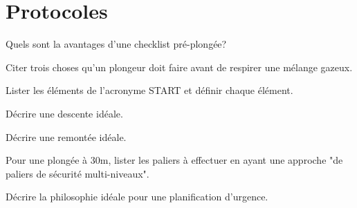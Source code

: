 \documentclass[english,12pt,a4paper]{article}
\begin{document}
	\section{Protocoles}
	\begin{outline}
		\1 Quels sont la avantages d'une checklist pré-plongée?
			\2[] \hspace{-2em}\hrulefill
			\2[] \hspace{-2em}\hrulefill
			\2[] \hspace{-2em}\hrulefill

		\1 Citer trois choses qu'un plongeur doit faire avant de respirer une mélange gazeux.
			\2[] \hspace{-2em}\hrulefill
			\2[] \hspace{-2em}\hrulefill
			\2[] \hspace{-2em}\hrulefill

		\1 Lister les éléments de l'acronyme START et définir chaque élément.
			\2[S] \hrulefill
			\2[T] \hrulefill
			\2[A] \hrulefill
			\2[R] \hrulefill
			\2[T] \hrulefill

		\1 Décrire une descente idéale.
			\2[] \hspace{-2em}\hrulefill
			\2[] \hspace{-2em}\hrulefill
			\2[] \hspace{-2em}\hrulefill

		\1 Décrire une remontée idéale.
			\2[] \hspace{-2em}\hrulefill
			\2[] \hspace{-2em}\hrulefill
			\2[] \hspace{-2em}\hrulefill

		\1 Pour une plongée à 30m, lister les paliers à effectuer en ayant une approche "de paliers de sécurité multi-niveaux".
			\2[] \hspace{-2em}\hrulefill
			\2[] \hspace{-2em}\hrulefill
			\2[] \hspace{-2em}\hrulefill

		\1 Décrire la philosophie idéale pour une planification d'urgence.
			\2[] \hspace{-2em}\hrulefill
			\2[] \hspace{-2em}\hrulefill
			\2[] \hspace{-2em}\hrulefill
	\end{outline}
	\pagebreak

\end{document}
